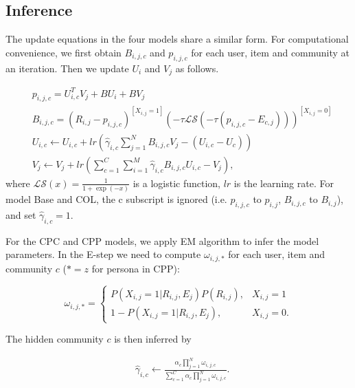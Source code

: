 \documentclass[sigconf]{acmart}
\newenvironment{shrinkeq}[1]
{ \bgroup
  \addtolength\abovedisplayshortskip{#1}
  \addtolength\abovedisplayskip{#1}
  \addtolength\belowdisplayshortskip{#1}
  \addtolength\belowdisplayskip{#1}}
{\egroup\ignorespacesafterend}
\begin{document}
\subsection{Inference}

The update equations in the four models share a similar form. For computational convenience, we first obtain $B_{i,j,c}$ and $p_{i,j,c}$ for each user, item and community at an iteration. Then we update $U_i$ and $V_j$ as follows.

\begin{shrinkeq}{-2ex}
\begin{equation}\label{equ:update}
\begin{split}
&p_{i,j,c}=U_{i,c}^{T}V_{j} + BU_{i} + BV_{j} \\
&B_{i,j,c}=(R_{i,j}-p_{i,j,c})^{[X_{i,j}=1]}(-\tau \mathcal{LS}(-\tau(p_{i,j,c}-E_{c,j})))^{[X_{i,j}=0]} \\
&U_{i,c}\leftarrow U_{i,c}+lr(\hat{\gamma}_{i,c}\sum\limits_{j=1}^{N}B_{i,j,c}V_j-(U_{i,c}-U_c)) \\
&V_j\leftarrow V_j+lr(\sum\limits_{c=1}^{C}\sum\limits_{i=1}^{M}\hat{\gamma}_{i,c}B_{i,j,c}U_{i,c}-V_j), 
\end{split}
\end{equation}
\end{shrinkeq}
where $\mathcal{LS}(x)=\frac{1}{1+\exp(-x)}$ is a logistic function, $lr$ is the learning rate. For model Base and COL, the c subscript is ignored (i.e. $p_{i,j,c}$ to $p_{i,j}$, $B_{i,j,c}$ to $B_{i,j}$), and set $\hat{\gamma}_{i,c}=1$. 

For the CPC and CPP models, we apply EM algorithm to infer the model parameters. In the E-step we need to compute $\omega_{i,j,*}$ for each user, item and community $c$ ($*=z$ for persona in CPP):

\begin{equation}
\omega_{i,j,*}=
\begin{cases}
P(X_{i,j}=1|R_{i,j},E_{j})P(R_{i,j}),& \text{$X_{i,j}=1$}\\\nonumber
1-P(X_{i,j}=1|R_{i,j},E_{j}),& \text{$X_{i,j}=0$}.
\end{cases}
\end{equation}

The hidden community $c$ is then inferred by

\begin{equation}\label{equ:updateCPC}
\begin{split}
&\hat{\gamma}_{i,c}\leftarrow\frac{\alpha_c\prod_{j=1}^{N}\omega_{i,j,c}}{\sum_{c=1}^{C}\alpha_c\prod_{j=1}^{N}\omega_{i,j,c}}. 
\end{split}
\end{equation}
\end{document}
